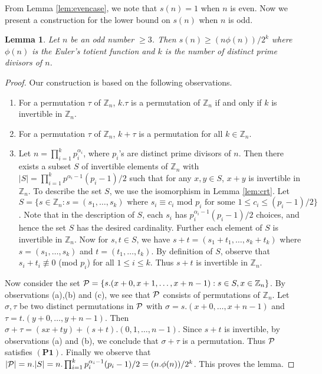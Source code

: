\documentclass[12pt]{article}
\newcommand{\mb}{\mathbb}
\newtheorem{lemma}[defn]{{\bf Lemma}}
\begin{document}
From Lemma \ref{lem:evencase}, we note that $s(n)=1$ when $n$ is even. Now
we present a construction for the lower bound on $s(n)$ when $n$ is odd.
 \begin{lemma}\label{lem:lb}
Let $n$ be an odd number $\geq 3$.  Then $s(n)\geq (n\phi(n))/2^k$ where $\phi(n)$ is
the Euler's totient function and $k$ is the number of distinct prime
divisors of $n$.
\end{lemma}
\begin{proof}
Our construction is based on the following observations.
\begin{enumerate}[{\rm (a)}]
\item For a permutation $\tau$ of ${\mathbb Z}_n$, $k.\tau$ is a
permutation of ${\mathbb Z}_n$ if and only if $k$ is invertible in
${\mathbb Z}_n$.
\item For a permutation $\tau$ of ${\mathbb Z}_n$, $k+\tau$ is a
permutation for all $k\in \mathbb{Z}_n$. 
\item Let $n=\prod_{i=1}^k p_i^{\alpha_i}$, where $p_i$'s are distinct prime
divisors of $n$. Then there exists a subset $S$ of invertible elements of $\mathbb{Z}_n$ with
$|S|=\prod_{i=1}^k p^{\alpha_i-1}(p_i-1)/2$ such that for any $x,y\in S$,
$x+y$ is invertible in $\mathbb{Z}_n$. To describe the set $S$, we use the
isomorphism in Lemma \ref{lem:crt}. 
Let $S=\{s\in \mb{Z}_n: s=(s_1,\ldots,s_k) \text{ where } s_i\equiv c_i
\text{ mod } p_i \text{ for some } 1\leq c_i\leq (p_i-1)/2\}$. Note that in
the description of $S$, each $s_i$ has $p_i^{\alpha_i-1}(p_i-1)/2$ choices,
and hence the set $S$ has the desired cardinality. Further each element of $S$ is invertible in
$\mathbb{Z}_n$. Now for $s,t\in S$, we have
$s+t=(s_1+t_1,\ldots, s_k+t_k)$ where $s=(s_1,\ldots,s_k)$ and
$t=(t_1,\ldots,t_k)$. By definition of $S$, observe that
$s_i+t_i\not\equiv 0$ (mod $p_i$) for all $1\leq i\leq k$. Thus
$s+t$ is invertible in $\mathbb{Z}_n$.   
\end{enumerate}
Now consider the set 
${\cal P}=\{s.(x+0,x+1,\ldots,x+n-1): s\in S, x\in \mathbb{Z}_n\}$. By
observations (a),(b) and (c), we see that ${\cal P}$ consists of
permutations of $\mathbb{Z}_n$. Let $\sigma,\tau$ be two distinct
permutations in ${\cal P}$ with $\sigma=s.(x+0,\ldots,x+n-1)$ and
$\tau=t.(y+0,\ldots,y+n-1)$. Then
$\sigma+\tau=(sx+ty)+(s+t).(0,1,\ldots,n-1)$. Since $s+t$ is invertible, by
observations (a) and (b), we conclude that $\sigma+\tau$ is a permutation.
Thus ${\cal P}$ satisfies $\mathbf{(P1)}$. Finally we observe that $|{\cal
P}|=n.|S|=n.\prod_{i=1}^k p_i^{\alpha_i-1}(p_i-1)/2 = (n.\phi(n))/2^k$.
This proves the lemma.
\end{proof}
\end{document}
